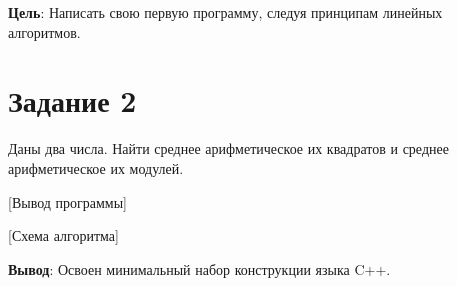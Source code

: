 \documentclass{bsuir}
\begin{document}

\textbf{Цель}: Написать свою первую программу, следуя принципам линейных
алгоритмов.

\section*{Задание 2}

Даны два числа. Найти среднее арифметическое их квадратов и среднее
арифметическое их модулей.


[Вывод программы]

[Схема алгоритма]

\textbf{Вывод}: Освоен минимальный набор конструкции языка C++.
\end{document}
